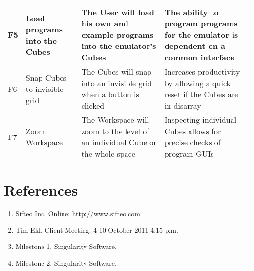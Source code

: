\documentclass[12pt]{article}
\begin{document}
\begin{landscape}
\begin{table}[h!]
\begin{tabular}{p{.25in} | p{2.75in} | p{3in} | p{3in}}
        F5 &
        Load programs into the Cubes &
        The User will load his own and example programs into the emulator’s\index{emulator} Cubes &
        The ability to program programs for the emulator\index{emulator} is dependent on a common interface
        \\ \hline

        F6 &
        Snap Cubes to invisible grid &
        The Cubes will snap into an invisible grid when a button is clicked &
        Increases productivity by allowing a quick reset if the Cubes are in disarray
        \\ \hline

        F7 &
        Zoom Workspace &
        The Workspace will zoom to the level of an individual Cube or the whole space &
        Inspecting individual Cubes allows for precise checks of program \glspl{GUI}\index{GUI}\glsadd{GUIa}
        \\ \hline

      \end{tabular}
    \end{table}
    \end{landscape}

\clearpage
{}
\printglossaries
\clearpage

\section*{References}

        \begin{enumerate}
                \item{Sifteo Inc. Online: http://www.sifteo.com}
                \item{Tim Ekl.  Client Meeting. 4 10 October 2011 4:15 p.m.}
                \item{Milestone 1.  Singularity Software.}
                \item{Milestone 2.  Singularity Software.}
        \end{enumerate}

\clearpage

\printindex
\end{document}

